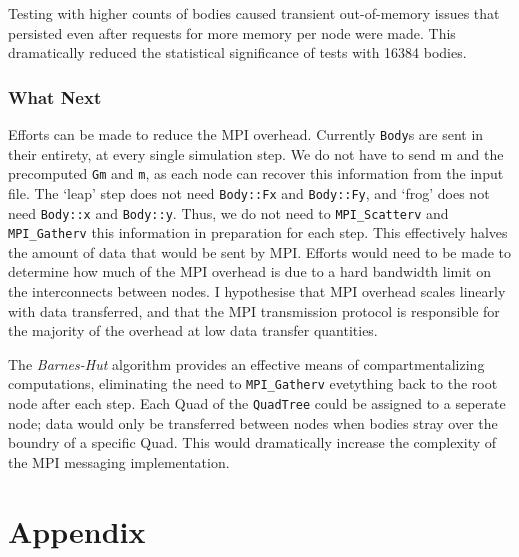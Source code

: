 \documentclass[11pt,a4paper]{article}
\begin{document}
Testing with higher counts of bodies caused transient out-of-memory issues that persisted even after requests for more memory per node were made. This dramatically reduced the statistical significance of tests with 16384 bodies.

 \subsubsection*{What Next}

Efforts can be made to reduce the MPI overhead. Currently \texttt{Body}s are sent in their entirety, at every single simulation step. We do not have to send m and the precomputed \texttt{Gm} and \texttt{m}, as each node can recover this information from the input file. The `leap' step does not need \texttt{Body::Fx} and \texttt{Body::Fy}, and `frog' does not need \texttt{Body::x} and \texttt{Body::y}. Thus, we do not need to \texttt{MPI\_Scatterv} and \texttt{MPI\_Gatherv} this information in preparation for each step. This effectively halves the amount of data that would be sent by MPI. Efforts would need to be made to determine how much of the MPI overhead is due to a hard bandwidth limit on the interconnects between nodes. I hypothesise that MPI overhead scales linearly with data transferred, and that the MPI transmission protocol is responsible for the majority of the overhead at low data transfer quantities. 

The \textit{Barnes-Hut} algorithm provides an effective means of compartmentalizing computations, eliminating the need to \texttt{MPI\_Gatherv} evetything back to the root node after each step. Each Quad of the \texttt{QuadTree} could be assigned to a seperate node; data would only be transferred between nodes when bodies stray over the boundry of a specific Quad. This would dramatically increase the complexity of the MPI messaging implementation.




\section*{Appendix}
\end{document}
